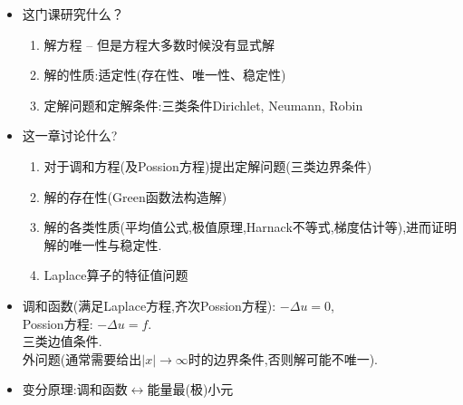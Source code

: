 \documentclass[12pt, a4paper]{ctexbook}
\begin{document}
    \begin{itemize}
        \item 这门课研究什么？
        \begin{enumerate}
            \item 解方程 -- 但是方程大多数时候没有显式解
            \item 解的性质:适定性(存在性、唯一性、稳定性)
            \item 定解问题和定解条件:三类条件\quad Dirichlet, Neumann, Robin
        \end{enumerate}
        \item 这一章讨论什么?
        \begin{enumerate}
            \item 对于调和方程(及Possion方程)提出定解问题(三类边界条件)
            \item 解的存在性(Green函数法构造解)
            \item 解的各类性质(平均值公式,极值原理,Harnack不等式,梯度估计等),进而证明解的唯一性与稳定性.
            \item Laplace算子的特征值问题
        \end{enumerate}
        \item 调和函数(满足Laplace方程,齐次Possion方程): $-\Delta u = 0$,\\ Possion方程: $-\Delta u = f$.\\ 三类边值条件.\\ 外问题(通常需要给出$|x|\rightarrow\infty$时的边界条件,否则解可能不唯一).\\
        \item 变分原理:调和函数$\leftrightarrow$能量最(极)小元
        

\end{itemize}
\end{document}
